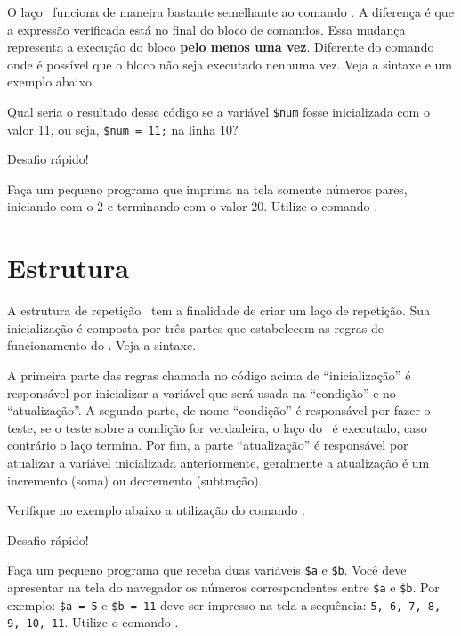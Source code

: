 O laço \comandodowhile~funciona de maneira bastante semelhante ao comando \comandowhile.
A diferença é que a expressão verificada está no final do bloco de comandos. Essa mudança
representa a execução do bloco \textbf{pelo menos uma vez}. Diferente do comando \comandowhile
onde é possível que o bloco não seja executado nenhuma vez. Veja a sintaxe e um exemplo
abaixo.



Qual seria o resultado desse código se a variável \texttt{\$num} fosse inicializada com o valor
11, ou seja, \texttt{\$num = 11;} na linha 10?

\begin{framed}
{\Large Desafio rápido!}

Faça um pequeno programa que imprima na tela somente números pares, iniciando com o 2
e terminando com o valor 20. Utilize o comando \comandodowhile. 
\end{framed}

\section{Estrutura \comandofor}

A estrutura de repetição \comandofor~tem a finalidade de criar um laço de repetição.
Sua inicialização é composta por três partes que estabelecem as regras
de funcionamento do \comandofor. Veja a sintaxe.



A primeira parte das regras chamada no código acima de ``inicialização'' é responsável
por inicializar a variável que será usada na ``condição'' e no ``atualização''. A 
segunda parte, de nome ``condição'' é responsável por fazer o teste, se o teste sobre
a condição for verdadeira, o laço do \comandofor~é executado, caso contrário
o laço termina. Por fim, a parte ``atualização'' é responsável por atualizar a variável
inicializada anteriormente, geralmente a atualização é um incremento (soma) ou 
decremento (subtração).

Verifique no exemplo abaixo a utilização do comando \comandofor.



{\Large Desafio rápido!}

Faça um pequeno programa que receba duas variáveis \texttt{\$a} e \texttt{\$b}. Você deve
apresentar na tela do navegador os números correspondentes entre \texttt{\$a} e 
\texttt{\$b}. Por exemplo: \texttt{\$a = 5} e \texttt{\$b = 11} deve ser impresso na tela
a sequência: \texttt{5, 6, 7, 8, 9, 10, 11}. Utilize o comando \comandofor.

